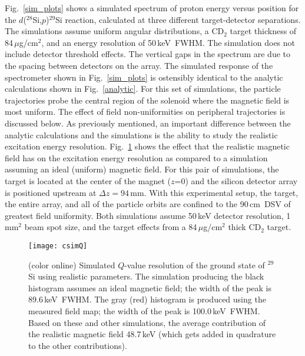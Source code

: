Fig.~\ref{sim_plots} shows a simulated spectrum of proton energy versus position for the $d$($^{28}$Si,$p$)$^{29}$Si reaction, calculated at three different target-detector separations.  The simulations assume uniform angular distributions, a CD$_2$ target thickness of 84\,$\mu$g/cm$^2$, and an energy resolution of 50\,keV~FWHM.  The simulation does not include detector threshold effects.  The vertical gaps in the spectrum are due to the spacing between detectors on the array.  The simulated response of the spectrometer shown in Fig.~\ref{sim_plots} is ostensibly  identical to the analytic calculations shown in Fig.~\ref{analytic}.  For this set of simulations, the particle trajectories probe the central region of the solenoid where the magnetic field is most uniform.  The effect of field non-uniformities on peripheral trajectories is discussed below.  As previously mentioned, an important difference between the analytic calculations and the simulations is the ability to study the realistic excitation energy resolution.  Fig.~\ref{sim_res} shows the effect that the realistic magnetic field has on the excitation energy resolution as compared to a simulation assuming an ideal (uniform) magnetic field.  For this pair of simulations, the target is located at the center of the magnet ($z$=0) and the silicon detector array is positioned upstream at $\Delta z = 94\,$mm.  With this experimental setup, the target, the entire array, and all of the particle orbits are confined to the 90\,cm~DSV of greatest field uniformity.  Both simulations assume 50\,keV detector resolution, 1\,mm$^2$ beam spot size, and the target effects from a 84\,$\mu$g/cm$^2$ thick  CD$_2$ target.

\begin{figure}%
\centering
\texttt{[image: csimQ]}%
\caption[Simulated $Q$-value resolution of the ground state of $^{29}$Si using realistic parameters]{(color online) Simulated $Q$-value resolution of the ground state of $^{29}$Si using realistic parameters.  The simulation producing the black histogram assumes an ideal magnetic field; the width of the peak is 89.6\,keV~FWHM.  The gray (red) histogram is produced using the measured field map; the width of the peak is 100.0\,keV~FWHM.  Based on these and other simulations, the average contribution of the realistic magnetic field 48.7\,keV (which gets added in quadrature to the other contributions).}%
\label{sim_res}%
\end{figure}

